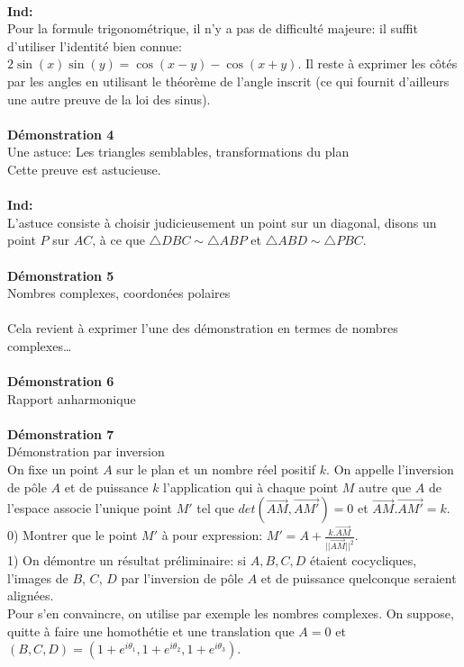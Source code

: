 \documentclass{article}
\begin{document}
\\
\textbf{Ind:}\\
Pour la formule trigonom\'etrique, il n'y a pas de difficult\'e majeure: il suffit d'utiliser l'identit\'e bien connue: $2\sin(x)\sin(y)=\cos(x-y)-\cos(x+y)$. Il reste \`a exprimer les c\^ot\'es par les angles en utilisant le th\'eor\`eme de l'angle inscrit (ce qui fournit d'ailleurs une autre preuve de la loi des sinus).\\
\\
\textbf{D\'emonstration 4}\\
Une astuce: Les triangles semblables, transformations du plan\\
Cette preuve est astucieuse.\\
\\
\textbf{Ind:}\\
L'astuce consiste \`a choisir judicieusement un point sur un diagonal, disons un point $P$ sur $AC$, \`a ce que $\triangle DBC\sim\triangle ABP$ et $\triangle ABD\sim\triangle PBC$.\\
\\
\textbf{D\'emonstration 5}\\
Nombres complexes, coordon\'ees polaires\\
\\
Cela revient \`a exprimer l'une des d\'emonstration en termes de nombres complexes\dots\\
\\
\textbf{D\'emonstration 6}\\
Rapport anharmonique\\
\\
\textbf{D\'emonstration 7}\\
D\'emonstration par inversion\\
On fixe un point $A$ sur le plan et un nombre r\'eel positif $k$. On appelle l'inversion de p\^ole $A$ et de puissance $k$ l'application qui \`a chaque point $M$ autre que $A$ de l'espace associe l'unique point $M'$ tel que $det(\overrightarrow{AM},\overrightarrow{AM'})=0$ et $\overrightarrow{AM}.\overrightarrow{AM'}=k$.\\
0) Montrer que le point $M'$ \`a pour expression: $M'=A+\frac{k.\overrightarrow{AM}}{||\overrightarrow{AM}||^2}$.\\
1) On d\'emontre un r\'esultat pr\'eliminaire: si $A,B,C,D$ \'etaient cocycliques, l'images de $B$, $C$, $D$ par l'inversion de p\^ole $A$ et de puissance quelconque seraient align\'ees.\\
Pour s'en convaincre, on utilise par exemple les nombres complexes. On suppose, quitte \`a faire une homoth\'etie et une translation que $A=0$ et $(B,C,D)=(1+e^{i\theta_1},1+e^{i\theta_2},1+e^{i\theta_3})$.\\
\end{document}
